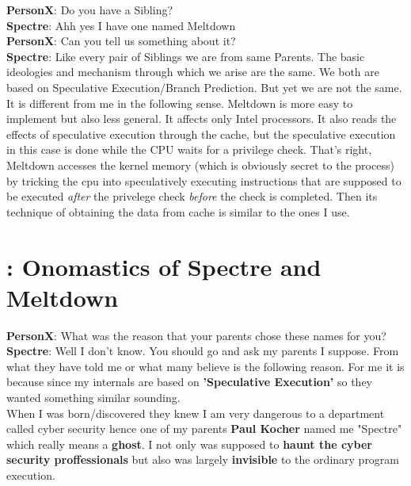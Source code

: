 \documentclass[12pt]{article}
\begin{document}
\begin{appendices}
	\textbf{PersonX}: Do you have a Sibling?\\
	
	\textbf{Spectre}: Ahh yes I have one named Meltdown\\
	
	\textbf{PersonX}: Can you tell us something about it?\\
	
	\textbf{Spectre}: Like every pair of Siblings we are from same Parents. The basic ideologies and mechanism through which we arise are the same. We both are based on Speculative Execution/Branch Prediction. But yet we are not the same. It is different from me in the following sense. Meltdown is more easy to implement but also less general. It affects only Intel processors. It also reads the effects of speculative execution through the cache, but the speculative execution in this case is done while the CPU waits for a privilege check. 
	That's right, Meltdown accesses the kernel memory (which is obviously secret to the process) by tricking the cpu into speculatively executing instructions that are supposed to be executed \textit{after} the privelege check \textit{before} the check is completed. Then its technique of obtaining the data from cache is similar to the ones I use. 
	\section{:  Onomastics of Spectre and Meltdown \cite{NameOrigin}}
	
	\textbf{PersonX}: What was the reason that your parents chose these names for you?\\
	
	\textbf{Spectre}: Well I don't know. You should go and ask my parents I suppose. From what they have told me or what many believe is the following reason. For me it is because since my internals are based on \textbf{'Speculative Execution'}  so they wanted something similar sounding.\\ When I was born/discovered they knew I am very dangerous to a department called cyber security hence one of my parents \textbf{Paul Kocher} named me "Spectre" which really means a \textbf{ghost}. I not only was supposed to \textbf{haunt the cyber security proffessionals} but also was largely \textbf{invisible} to the ordinary program execution.\\
	

\end{appendices}
\end{document}
